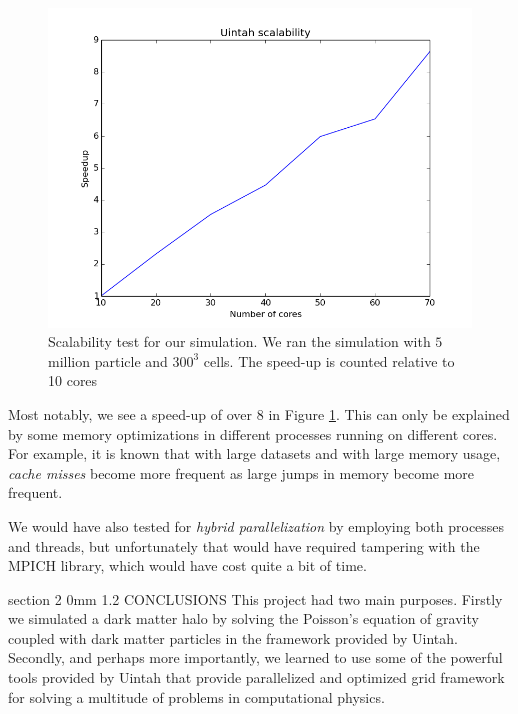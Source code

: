 \documentclass[notitlepage, 12pt]{article}
\makeatletter
\renewcommand{\section}{\@startsection       %
        {section}
        {2}
        {0mm}
        {1.2\baselineskip}
        {\baselineskip}
        {\centering\normalsize}}
\makeatother
\begin{document}
\begin{figure}[H]
\centering
\includegraphics[width=\textwidth]{Uintah/scalability2.png}
\caption{Scalability test for our simulation. We ran the simulation with $5$ million particle and $300^3$ cells. The speed-up is counted relative to 
10 cores}
\label{fig:scalability2}
\end{figure}

Most notably, we see a speed-up of over $8$ in Figure \ref{fig:scalability2}. This can only be explained by some memory optimizations in different 
processes running on different cores. For example, it is known that with large datasets and with large memory usage, \emph{cache misses} become more frequent as 
large jumps in memory become more frequent.

We would have also tested for \emph{hybrid parallelization} by employing both processes and threads, but unfortunately that would have required 
tampering with the MPICH library, which would have cost quite a bit of time.


\section{CONCLUSIONS} \label{sec:conclusions}
This project had two main purposes. Firstly we simulated a dark matter halo by solving the Poisson's equation of gravity coupled with dark matter particles in the framework provided by Uintah. Secondly, and perhaps more importantly, we learned to use some of the powerful tools provided by Uintah that provide parallelized and optimized grid framework for solving a multitude of problems in computational physics.
\end{document}
